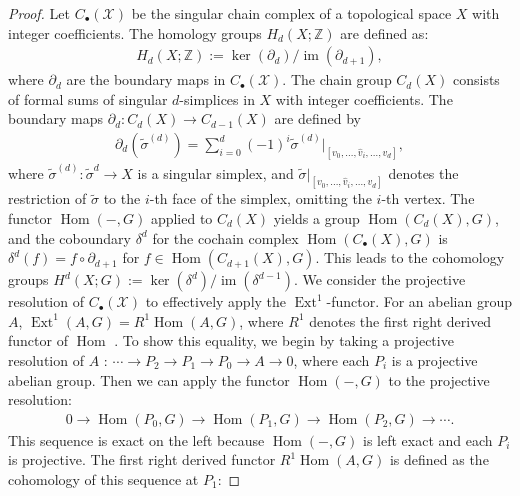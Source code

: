 \begin{proof}
Let $C_{\bullet}(\mathcal{X})$ be the singular chain complex of a topological space $X$ with integer coefficients. The homology groups $H_{d}(X; \mathbb{Z})$ are defined as:
\begin{align}
H_{d}(X; \mathbb{Z}) := \ker(\partial_{d}) / \operatorname{im}(\partial_{d+1}),
\end{align}
where $\partial_{d}$ are the boundary maps in $C_{\bullet}(\mathcal{X})$. The chain group $C_{d}(X)$ consists of formal sums of singular $d$-simplices in $X$ with integer coefficients. The boundary maps $\partial_{d}: C_{d}(X) \rightarrow C_{d-1}(X)$ are defined by
\begin{align}
\partial_{d}(\tilde{\sigma}^{(d)}) = \sum_{i=0}^{d}(-1)^{i} \tilde{\sigma}^{(d)}|_{[v_0, \ldots, \hat{v}_i, \ldots, v_d]},
\end{align}
where $\tilde{\sigma}^{(d)}: \tilde{\sigma}^{d} \rightarrow X$ is a singular simplex, and $\tilde{\sigma}|_{[v_0, \ldots, \hat{v}_i, \ldots, v_d]}$ denotes the restriction of $\tilde{\sigma}$ to the $i$-th face of the simplex, omitting the $i$-th vertex. The functor $\operatorname{Hom}(-, G)$ applied to $C_{d}(X)$ yields a group $\operatorname{Hom}(C_{d}(X), G)$, and the coboundary $\delta^{d}$ for the cochain complex $\operatorname{Hom}(C_{\bullet}(X), G)$ is $\delta^{d}(f) = f \circ \partial_{d+1}$ for $f \in \operatorname{Hom}(C_{d+1}(X), G)$. This leads to the cohomology groups $H^{d}(X; G) := \ker(\delta^{d}) / \operatorname{im}(\delta^{d-1})$. We consider the projective resolution of $C_{\bullet}(\mathcal{X})$ to effectively apply the $\operatorname{Ext}^1$-functor. For an abelian group $A$, $\operatorname{Ext}^{1}(A, G) = R^{1} \operatorname{Hom}(A, G)$, where $R^{1}$ denotes the first right derived functor of $\operatorname{Hom}$ \cite[Vista 3.4.6, \S 3.5]{Weibel1994}. To show this equality, we begin by taking a projective resolution of $A$ \cite[Definition 2.2.4]{Weibel1994}: $\cdots \to P_{2} \to P_{1} \to P_{0} \to A \to 0$, where each $P_{i}$ is a projective abelian group. Then we can apply the functor $\operatorname{Hom}(-, G)$ to the projective resolution:
\begin{align}
0 \to \operatorname{Hom}(P_{0}, G) \to \operatorname{Hom}(P_{1}, G) \to \operatorname{Hom}(P_{2}, G) \to \cdots.
\end{align}
This sequence is exact on the left because $\operatorname{Hom}(-, G)$ is left exact and each $P_{i}$ is projective. The first right derived functor $R^{1}\operatorname{Hom}(A, G)$ is defined as the cohomology of this sequence at $P_{1}$:

\end{proof}
